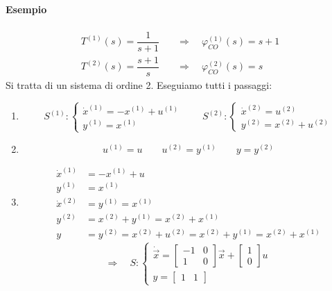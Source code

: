\documentclass[../main.tex]{subfiles}
\begin{document}
		\paragraph{Esempio}
			\[
				\begin{aligned}
					T^{(1)}(s) = \dfrac{1}{s+1}
					&\quad\Rightarrow\quad
					\varphi_{CO}^{(1)}(s) = s+1
					\\
					T^{(2)}(s) = \dfrac{s+1}{s}
					&\quad\Rightarrow\quad
					\varphi_{CO}^{(2)}(s) = s
				\end{aligned}
			\]
			Si tratta di un sistema di ordine 2. Eseguiamo tutti i passaggi:
			\begin{enumerate}
				\item 
					\[
						S^{(1)}:
						\begin{cases}
							\dot x^{(1)} = -x^{(1)} + u^{(1)}\\
							y^{(1)} = x^{(1)}
						\end{cases}
						\qquad
						S^{(2)}:
						\begin{cases}
							\dot x^{(2)} = u^{(2)}\\
							y^{(2)} = x^{(2)} + u^{(2)}
						\end{cases}
					\]
				\item 
					\[
						u^{(1)} = u \qquad u^{(2)} = y^{(1)} \qquad y = y^{(2)}
					\]
				\item 
					\[
						\begin{aligned}
							\dot x^{(1)} &= -x^{(1)} + u\\
							y^{(1)} &= x^{(1)}\\
							\dot x^{(2)} &= y^{(1)} = x^{(1)}\\
							y^{(2)} &= x^{(2)} + y^{(1)} = x^{(2)} + x^{(1)}\\
							y &= y^{(2)} = x^{(2)} + u^{(2)} = x^{(2)} + y^{(1)} = x^{(2)} + x^{(1)}
						\end{aligned}
					\]
					\[
						\Rightarrow\quad S:
						\begin{cases}
							\dot{\vec x} =
							\begin{bmatrix}
								-1 & 0\\
								1 & 0
							\end{bmatrix} \vec x +
							\begin{bmatrix}
								1\\
								0
							\end{bmatrix} u
							\\
							y =
							\begin{bmatrix}
								1 & 1

\end{bmatrix}
\end{cases}\]
\end{enumerate}
\end{document}
